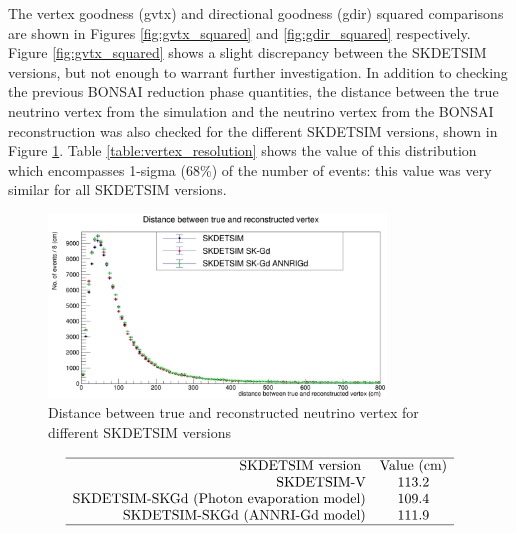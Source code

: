 The vertex goodness (gvtx) and directional goodness (gdir) squared comparisons are shown in Figures \ref{fig:gvtx_squared} and \ref{fig:gdir_squared} respectively. Figure \ref{fig:gvtx_squared} shows a slight discrepancy between the SKDETSIM versions, but not enough to warrant further investigation. In addition to checking the previous BONSAI reduction phase quantities, the distance between the true neutrino vertex from the simulation and the neutrino vertex from the BONSAI reconstruction was also checked for the different SKDETSIM versions, shown in Figure \ref{fig:vertex_resolution}. Table \ref{table:vertex_resolution} shows the value of this distribution which encompasses 1-sigma (68\%) of the number of events: this value was very similar for all SKDETSIM versions.
\begin{figure}[htp]

    \includegraphics[width=0.8\textwidth]{Figures/vertex_resolution.png}
    \caption{Distance between true and reconstructed neutrino vertex for different SKDETSIM versions}
    \label{fig:vertex_resolution}

\end{figure}

\begin{table}
    $$
    \begin{array}{rcc}
    \hline \text { SKDETSIM version } & \text{Value (cm)} \\
    \text{SKDETSIM-V} & 113.2\\
    \text{SKDETSIM-SKGd (Photon evaporation model)} & 109.4 \\
    \text{SKDETSIM-SKGd (ANNRI-Gd model)} & 111.9 \\
    \hline
    \end{array}
    $$
\caption{Value of the true neutrino vertex - reconstructed neutrino vertex distribution which encompasses 1-sigma (68\%) of the number of events.}
\label{table:vertex_resolution}
\end{table}

